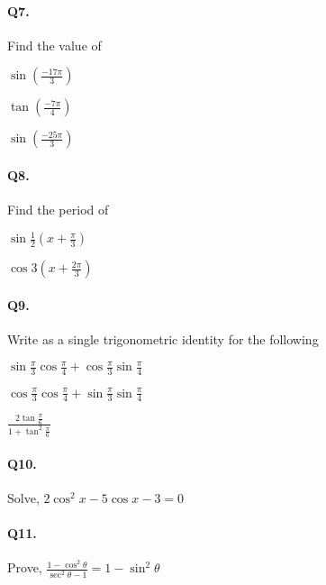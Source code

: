 \documentclass{article}
\begin{document}
\paragraph{Q7.}
Find the value of

\begin{enumerate*}[label=\roman*)]
  \item $\sin \left( \frac{-17\pi}{3} \right)$
  \item $\tan \left( \frac{-7\pi}{4} \right)$
  \item $\sin \left( \frac{-25\pi}{3} \right)$
\end{enumerate*}

\paragraph{Q8.}
Find the period of

\begin{enumerate*}[label=\roman*)]
  \item $\sin \frac{1}{2} \left( x + \frac{\pi}{3} \right)$
  \item $\cos 3 \left( x + \frac{2\pi}{3} \right)$
\end{enumerate*}

\paragraph{Q9.}
Write as a single trigonometric identity for the following

\begin{enumerate*}[label=\roman*)]
  \item $\sin \frac{\pi}{3} \cos \frac{\pi}{4} + \cos \frac{\pi}{3} \sin \frac{\pi}{4}$
  \item $\cos \frac{\pi}{3} \cos \frac{\pi}{4} + \sin \frac{\pi}{3} \sin \frac{\pi}{4}$
  \item $\frac{2\tan\frac{\pi}{6}}{1+\tan^{2}\frac{\pi}{6}}$
\end{enumerate*}

\paragraph{Q10.}
Solve, $2\cos^{2}x - 5\cos x-3=0$

\paragraph{Q11.}
Prove, $\frac{1-\cos^{2}\theta}{\sec^{2}\theta - 1} = 1-\sin^{2}\theta$
\end{document}
